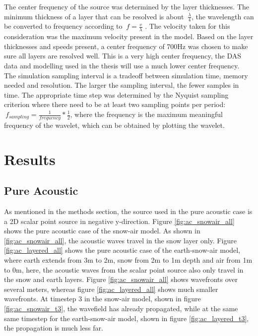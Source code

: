 \documentclass[a4paper,10pt]{article}
\begin{document}
\noindent The center frequency of the source was determined by the layer thicknesses. The minimum thickness of a layer that can be resolved is about $\ \frac{\lambda}{4}$, the wavelength can be converted to frequency according to $ \ f = \frac{v}{\lambda}$ \parencite{SeismicResolutionVertical2018}. The velocity taken for this consideration was the maximum velocity present in the model. Based on the layer thicknesses and speeds present, a center frequency of 700Hz was chosen to make sure all layers are resolved well. This is a very high center frequency, the DAS data and modelling used in the thesis will use a much lower center frequency. \\

\noindent The simulation sampling interval is a tradeoff between simulation time, memory needed and resolution. The larger the sampling interval, the fewer samples in time. The appropriate time step was determined by the Nyquist sampling criterion where there need to be at least two sampling points per period: $\ f_{sampling} = \frac{1}{frequency} * \frac{1}{2}$, where the frequency is the maximum meaningful frequency of the wavelet, which can be obtained by plotting the wavelet. 


\section{Results}
\subsection{Pure Acoustic}
\label{results_pure_ac}

\noindent As mentioned in the methods section, the source used in the pure acoustic case is a 2D scalar point source in negative y-direction. \noindent Figure \ref{fig:ac_snowair_all} shows the pure acoustic case of the snow-air model. As shown in \ref{fig:ac_snowair_all}, the acoustic waves travel in the snow layer only. Figure \ref{fig:ac_layered_all} shows the pure acoustic case of the earth-snow-air model, where earth extends from 3m to 2m, snow from 2m to 1m depth and air from 1m to 0m, here, the acoustic waves from the scalar point source also only travel in the snow and earth layers. Figure \ref{fig:ac_snowair_all} shows wavefronts over several meters, whereas figure \ref{fig:ac_layered_all} shows much smaller wavefronts. At timestep 3 in the snow-air model, shown in figure \ref{fig:ac_snowair_t3}, the wavefield has already propagated, while at the same same timestep for the earth-snow-air model, shown in figure \ref{fig:ac_layered_t3}, the propagation is much less far.
\end{document}
